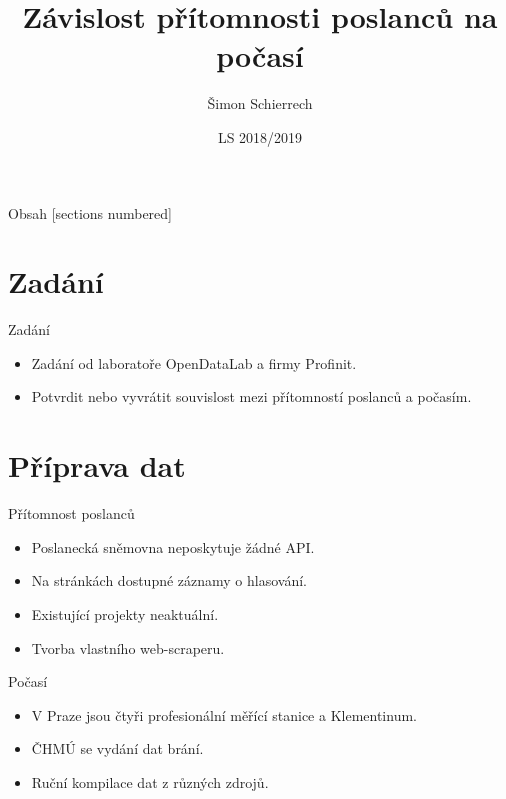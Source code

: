 \documentclass[10pt]{beamer}
\title{Závislost přítomnosti poslanců na počasí}
\date{LS 2018/2019}
\author{Šimon Schierrech}
\institute{Semestrální práce z předmětu \textbf{MI-ADM}}
\begin{document}
\maketitle

\begin{frame}{Obsah}
  [sections numbered]
  \tableofcontents[hideallsubsections]
\end{frame}

\section{Zadání}

\begin{frame}[fragile]{Zadání}

  \begin{itemize}
      \item Zadání od laboratoře OpenDataLab a firmy Profinit.
      \item Potvrdit nebo vyvrátit souvislost mezi přítomností poslanců a počasím.
  \end{itemize}
  
\end{frame}

\section{Příprava dat}

\begin{frame}{Přítomnost poslanců}
	\begin{itemize}
		\item Poslanecká sněmovna neposkytuje žádné API.
		\item Na stránkách dostupné záznamy o hlasování.
		\item Existující projekty neaktuální.
		\item Tvorba vlastního web-scraperu.
	\end{itemize}
\end{frame}

\begin{frame}{Počasí}
    \begin{itemize}
        \item V Praze jsou čtyři profesionální měřící stanice a Klementinum.
        \item ČHMÚ se vydání dat brání.
        \item Ruční kompilace dat z různých zdrojů.
    \end{itemize}
\end{frame}
\end{document}
